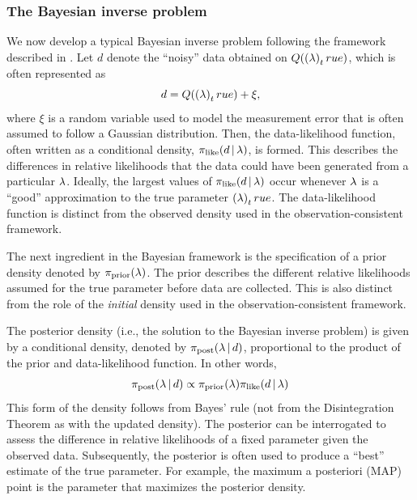 \subsubsection{The Bayesian inverse problem}

We now develop a typical Bayesian inverse problem following the framework described in \cite{Stuart10}.
Let $d$ denote the ``noisy'' data obtained on $Q(\left ( \lambda \right )_true)$, which is often represented as
\begin{equation*}
	d = Q(\left ( \lambda \right )_true) + \xi,
\end{equation*}
where $\xi$ is a random variable used to model the measurement error that is often assumed to follow a Gaussian distribution.
Then, the data-likelihood function, often written as a conditional density, $\pi_\text{like}(d\, |\, \lambda)$, is formed.
This describes the differences in relative likelihoods that the data could have been generated from a particular $\lambda$.
Ideally, the largest values of $\pi_\text{like}(d\, | \, \lambda)$ occur whenever $\lambda$ is a ``good'' approximation to the true parameter $\left ( \lambda \right )_true$.
The data-likelihood function is distinct from the observed density used in the observation-consistent framework.

The next ingredient in the Bayesian framework is the specification of a prior density denoted by $\pi_\text{prior}(\lambda)$.
The prior describes the different relative likelihoods assumed for the true parameter before data are collected.
This is also distinct from the role of the {\em initial} density used in the observation-consistent framework.

The posterior density (i.e., the solution to the Bayesian inverse problem) is given by a conditional density, denoted by $\pi_\text{post}(\lambda\, | \, d)$, proportional to the product of the prior and data-likelihood function.
In other words,
\begin{equation*}
	\pi_\text{post}(\lambda\, | \, d) \propto \pi_\text{prior}(\lambda)\pi_\text{like}(d\, | \, \lambda)
\end{equation*}
This form of the density follows from Bayes' rule (not from the Disintegration Theorem as with the updated density).
The posterior can be interrogated to assess the difference in relative likelihoods of a fixed parameter given the observed data.
Subsequently, the posterior is often used to produce a ``best'' estimate of the true parameter.
For example, the maximum a posteriori (MAP) point is the parameter that maximizes the posterior density.

